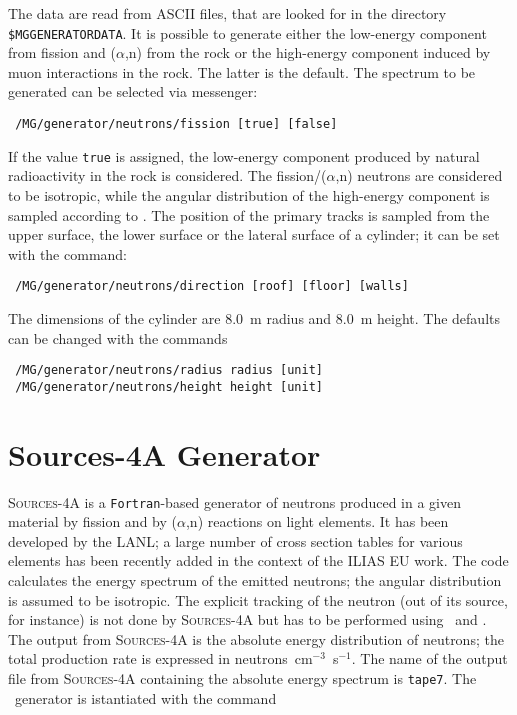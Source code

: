 The data are read from ASCII files, that are looked for in the directory 
\texttt{\$MGGENERATORDATA}. 
It is possible to generate either the low-energy component from 
fission and ($\alpha$,n) from the rock or the high-energy component induced 
by muon interactions in the rock. The latter is the default. The spectrum to 
be generated can be selected via messenger:
\begin{lstlisting}
 /MG/generator/neutrons/fission [true] [false]
\end{lstlisting}
If the value \texttt{true} is assigned, the low-energy component produced by natural 
radioactivity in the rock is considered.
The fission/($\alpha$,n) neutrons are considered to be isotropic, while the 
angular distribution of the high-energy component is sampled according to 
\cite{Wulandari:2004}. 
The position of the primary tracks is sampled from the 
upper surface, the lower surface or the lateral surface of a cylinder; it 
can be set with the command:
\begin{lstlisting}
 /MG/generator/neutrons/direction [roof] [floor] [walls]
\end{lstlisting}
The dimensions of the cylinder are 8.0~m radius and 8.0~m height. The defaults 
can be changed with the commands
\begin{lstlisting}
 /MG/generator/neutrons/radius radius [unit]
 /MG/generator/neutrons/height height [unit]
\end{lstlisting}
%

\section{Sources-4A Generator}
\textsc{Sources-4A} is a \texttt{Fortran}-based generator of neutrons produced 
in a given material by fission and by ($\alpha$,n) reactions on light elements. 
It has been developed by the LANL; a large number of cross section tables for 
various elements has been recently added in the context of the ILIAS 
EU work. The code calculates the energy spectrum of the emitted neutrons; 
the angular distribution is assumed to be isotropic. The explicit 
tracking of the neutron (out of its source, for instance) is not done 
by \textsc{Sources-4A} but has to be performed using \mage\ and \geant.\\ 
The output from \textsc{Sources-4A} is the absolute energy distribution of neutrons; 
the total production rate is expressed in \mbox{neutrons cm$^{-3}$ s$^{-1}$}. The name of the 
output file from \textsc{Sources-4A} containing the absolute energy spectrum is \texttt{tape7}. 
The \mage \ generator is istantiated with the command
 
